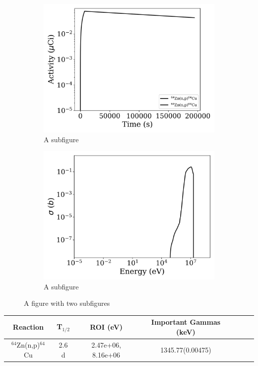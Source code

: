 \begin{figure}[h]
\centering
\begin{subfigure}{.5\textwidth}
  \centering
     \includegraphics[width=.8\textwidth]{plot/Zn-64(n,p)Cu-64_library1} 

  \caption{A subfigure}
  \label{fig:sub1}
\end{subfigure}%
\begin{subfigure}{.5\textwidth}
  \centering
     \includegraphics[width=.8\textwidth]{plot/Zn-64(n,p)Cu-64} 

  \caption{A subfigure}
  \label{fig:sub2}
\end{subfigure}
\caption{A figure with two subfigures}
\label{fig:test}
\end{figure}

\begin{table}[h]
\centering
\begin{tabular}{ |c|c|c|c|c|c|c| }
 \hline
 Reaction & T$_{1/2}$ & ROI (eV) & Important Gammas (keV) \\
 \hline 
 $^{64}$Zn(n,p)$^{64}$Cu &  2.6 d & 2.47e+06, 8.16e+06 & 1345.77(0.00475) \\ 
\hline
\end{tabular}
\end{table}
